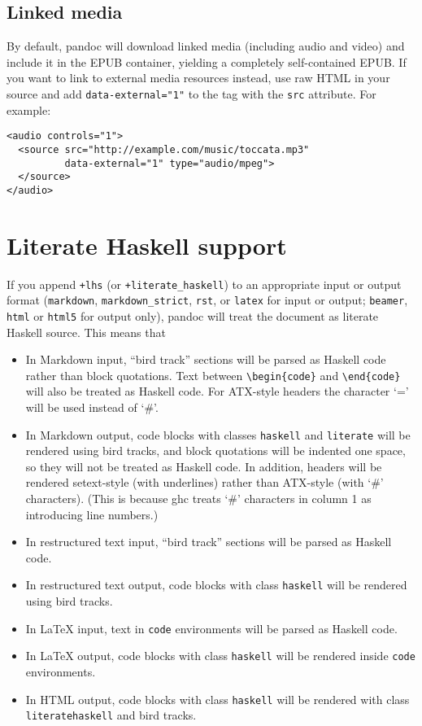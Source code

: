 \documentclass[]{article}
\begin{document}
\subsection{Linked media}\label{linked-media}

By default, pandoc will download linked media (including audio and
video) and include it in the EPUB container, yielding a completely
self-contained EPUB. If you want to link to external media resources
instead, use raw HTML in your source and add \texttt{data-external="1"}
to the tag with the \texttt{src} attribute. For example:

\begin{verbatim}
<audio controls="1">
  <source src="http://example.com/music/toccata.mp3"
          data-external="1" type="audio/mpeg">
  </source>
</audio>
\end{verbatim}

\hypertarget{literate-haskell-support}{\section{Literate Haskell
support}\label{literate-haskell-support}}

If you append \texttt{+lhs} (or \texttt{+literate\_haskell}) to an
appropriate input or output format (\texttt{markdown},
\texttt{markdown\_strict}, \texttt{rst}, or \texttt{latex} for input or
output; \texttt{beamer}, \texttt{html} or \texttt{html5} for output
only), pandoc will treat the document as literate Haskell source. This
means that

\begin{itemize}
\item
  In Markdown input, ``bird track'' sections will be parsed as Haskell
  code rather than block quotations. Text between
  \texttt{\textbackslash{}begin\{code\}} and
  \texttt{\textbackslash{}end\{code\}} will also be treated as Haskell
  code. For ATX-style headers the character `=' will be used instead of
  `\#'.
\item
  In Markdown output, code blocks with classes \texttt{haskell} and
  \texttt{literate} will be rendered using bird tracks, and block
  quotations will be indented one space, so they will not be treated as
  Haskell code. In addition, headers will be rendered setext-style (with
  underlines) rather than ATX-style (with `\#' characters). (This is
  because ghc treats `\#' characters in column 1 as introducing line
  numbers.)
\item
  In restructured text input, ``bird track'' sections will be parsed as
  Haskell code.
\item
  In restructured text output, code blocks with class \texttt{haskell}
  will be rendered using bird tracks.
\item
  In LaTeX input, text in \texttt{code} environments will be parsed as
  Haskell code.
\item
  In LaTeX output, code blocks with class \texttt{haskell} will be
  rendered inside \texttt{code} environments.
\item
  In HTML output, code blocks with class \texttt{haskell} will be
  rendered with class \texttt{literatehaskell} and bird tracks.
\end{itemize}
\end{document}
